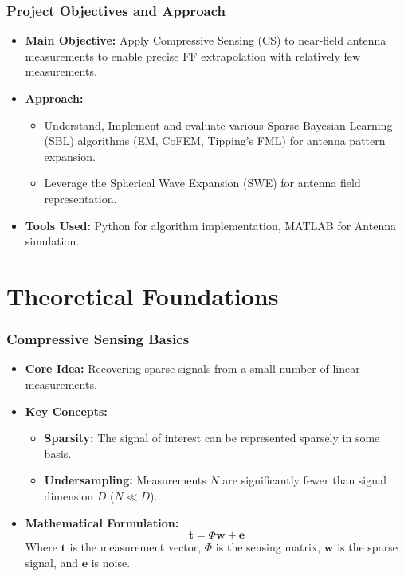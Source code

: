 \documentclass{beamer}
\begin{document}
\begin{frame}
    \frametitle{Project Objectives and Approach}
    \begin{itemize}
        \item \textbf{Main Objective:} Apply Compressive Sensing (CS) to near-field antenna measurements to enable precise FF extrapolation with relatively few measurements.
        \item \textbf{Approach:}
        \begin{itemize}
            \item Understand, Implement and evaluate various Sparse Bayesian Learning (SBL) algorithms (EM, CoFEM, Tipping's FML) for antenna pattern expansion.
            \item Leverage the Spherical Wave Expansion (SWE) for antenna field representation.
        \end{itemize}
        \item \textbf{Tools Used:} Python for algorithm implementation, MATLAB for Antenna simulation.
    \end{itemize}
\end{frame}

\section{Theoretical Foundations}

\begin{frame}
    \frametitle{Compressive Sensing Basics}
    \begin{itemize}
        \item \textbf{Core Idea:} Recovering sparse signals from a small number of linear measurements.
        \item \textbf{Key Concepts:}
        \begin{itemize}
            \item \textbf{Sparsity:} The signal of interest can be represented sparsely in some basis.
            \item \textbf{Undersampling:} Measurements $N$ are significantly fewer than signal dimension $D$ ($N \ll D$).
        \end{itemize}
        \item \textbf{Mathematical Formulation:}
        \begin{equation*}
            \mathbf{t} = \Phi \mathbf{w} + \mathbf{e}
        \end{equation*}
        Where $\mathbf{t}$ is the measurement vector, $\Phi$ is the sensing matrix, $\mathbf{w}$ is the sparse signal, and $\mathbf{e}$ is noise.
    \end{itemize}
\end{frame}
\end{document}
